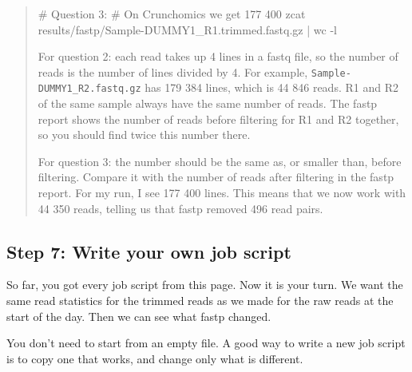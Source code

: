 \documentclass[
  letterpaper,
  DIV=11,
  numbers=noendperiod]{scrreprt}
\newenvironment{Shaded}{}{}
\newcommand{\AttributeTok}[1]{\textcolor[rgb]{0.84,0.23,0.29}{#1}}
\newcommand{\CommentTok}[1]{\textcolor[rgb]{0.42,0.45,0.49}{#1}}
\newcommand{\FunctionTok}[1]{\textcolor[rgb]{0.44,0.26,0.76}{#1}}
\newcommand{\KeywordTok}[1]{\textcolor[rgb]{0.84,0.23,0.29}{#1}}
\newcommand{\NormalTok}[1]{\textcolor[rgb]{0.14,0.16,0.18}{#1}}
\begin{document}
\begin{tcolorbox}
\begin{quote}
\begin{Shaded}
\begin{Highlighting}[]
\CommentTok{\# Question 3:}
\CommentTok{\# On Crunchomics we get 177 400}
\FunctionTok{zcat}\NormalTok{ results/fastp/Sample{-}DUMMY1\_R1.trimmed.fastq.gz }\KeywordTok{|} \FunctionTok{wc} \AttributeTok{{-}l}
\end{Highlighting}
\end{Shaded}

For question 2: each read takes up 4 lines in a fastq file, so the
number of reads is the number of lines divided by 4. For example,
\texttt{Sample-DUMMY1\_R2.fastq.gz} has 179 384 lines, which is 44 846
reads. R1 and R2 of the same sample always have the same number of
reads. The fastp report shows the number of reads before filtering for
R1 and R2 together, so you should find twice this number there.

For question 3: the number should be the same as, or smaller than,
before filtering. Compare it with the number of reads after filtering in
the fastp report. For my run, I see 177 400 lines. This means that we
now work with 44 350 reads, telling us that fastp removed 496 read
pairs.
\end{quote}

\end{tcolorbox}

\subsection{Step 7: Write your own job
script}\label{step-7-write-your-own-job-script}

So far, you got every job script from this page. Now it is your turn. We
want the same read statistics for the trimmed reads as we made for the
raw reads at the start of the day. Then we can see what fastp changed.

You don't need to start from an empty file. A good way to write a new
job script is to copy one that works, and change only what is different.
\end{document}
